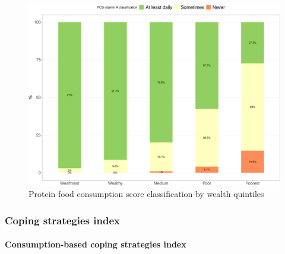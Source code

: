 \documentclass[12pt,a4paper]{article}
\let\oldparagraph\paragraph
\renewcommand{\paragraph}[1]{\oldparagraph{#1}\mbox{}}
\begin{document}
\begin{figure}[H]

{\centering \includegraphics{kayahReport_files/figure-latex/fcsn4plot-1} 

}

\caption{Protein food consumption score classification by wealth quintiles}\label{fig:fcsn4plot}
\end{figure}

\hypertarget{csi-results}{%
\subsubsection{Coping strategies index}\label{csi-results}}

\hypertarget{ccsi-results}{%
\paragraph{Consumption-based coping strategies index}\label{ccsi-results}}
\end{document}
